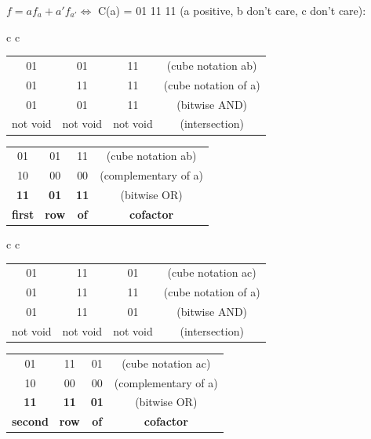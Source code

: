 $f = af_{a} + a'f_{a'} \Leftrightarrow$ C(a) = 01 11 11 (a positive, b don't care, c don't care):\\

\begin{center}
	\begin{tabular}{c  c}
		\begin{tabular}{c c c c}
			01 & 01 & 11 & (cube notation ab) \\ 
			01 & 11 & 11 & (cube notation of a)\\ \hline 
			01 & 01 & 11 & (bitwise AND) \\ \hline
			not void & not void & not void & (intersection)
		\end{tabular}
		\quad
		\quad
		\quad
		\begin{tabular}{c  c  c c}
			01 & 01 & 11 & (cube notation ab) \\
			10 & 00 & 00 & (complementary of a)\\ \hline 
			\textbf{11} & \textbf{01} & \textbf{11} & (bitwise OR) \\ \hline
			\textbf{first} & \textbf{row} & \textbf{of} & \textbf{cofactor} \\
		\end{tabular}
	\end{tabular}
\end{center}

\begin{center}
	\begin{tabular}{c  c}
		\begin{tabular}{c c c c}
			01 & 11 & 01 & (cube notation ac) \\ 
			01 & 11 & 11 & (cube notation of a)\\ \hline 
			01 & 11 & 01 & (bitwise AND) \\ \hline
			not void & not void & not void & (intersection)
		\end{tabular}
		\quad
		\quad
		\quad
		\begin{tabular}{c  c  c c}
			01 & 11 & 01 & (cube notation ac) \\
			10 & 00 & 00 & (complementary of a)\\ \hline 
			\textbf{11} & \textbf{11} & \textbf{01} & (bitwise OR) \\ \hline
			\textbf{second} & \textbf{row} & \textbf{of} & \textbf{cofactor} \\
		\end{tabular}
	\end{tabular}
\end{center}

